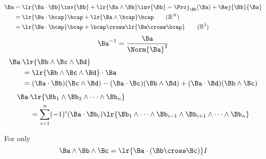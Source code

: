 \begin{equation}\label{eqn:helpful:140}
\begin{aligned}
\Ba
&= \lr{ \Ba \cdot \Bb} \inv{\Bb} + \lr{ \Ba \wedge \Bb} \inv{\Bb} = \Proj_\Bb(\Ba) + \Rej{\Bb}{\Ba} \\
&= \lr{ \Ba \cdot \bcap} \bcap + \lr{ \Ba \wedge \bcap} \bcap \qquad (\mathbb{R}^N) \\
&= \lr{ \Ba \cdot \bcap} \bcap + \bcap \cross \lr{ \Ba \cross \bcap}\qquad (\mathbb{R}^3) \\
\end{aligned}
\end{equation}
\begin{equation}\label{eqn:helpful:160}
\Ba^{-1} = \frac{\Ba}{\Norm{\Ba}^2}
\end{equation}
\begin{equation}\label{eqn:helpful:180}
\begin{aligned}
\Ba \cdot &\lr{ \Bb \wedge \Bc \wedge \Bd} \\
&=
\lr{ \Bb \wedge \Bc \wedge \Bd} \cdot \Ba \\
&=
( \Ba \cdot \Bb ) (\Bc \wedge \Bd)
-( \Ba \cdot \Bc ) (\Bb \wedge \Bd)
+( \Ba \cdot \Bd ) (\Bb \wedge \Bc)
\end{aligned}
\end{equation}
\begin{equation}\label{eqn:helpful:200}
\begin{aligned}
\Ba \cdot &\lr{ \Bb_1 \wedge \Bb_2 \wedge \cdots \wedge \Bb_n } \\
&=
\sum_{i = 1}^n (-1)^i (\Ba \cdot \Bb_i) \lr{ \Bb_1 \wedge \cdots \wedge \Bb_{i-1} \wedge \Bb_{i+1} \wedge \cdots \wedge \Bb_n }
\end{aligned}
\end{equation}

For  only
\begin{equation}\label{eqn:helpful:220}
\Ba \wedge \Bb \wedge \Bc = \lr{ \Ba \cdot (\Bb \cross \Bc) } I
\end{equation}
